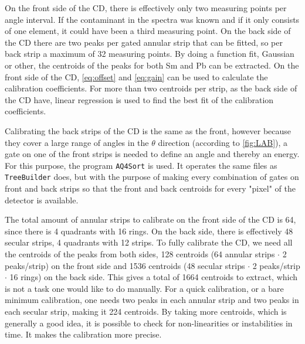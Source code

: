 \documentclass[twoside,english]{uiofysmaster/uiofysmaster}
\let\orgautoref\autoref
\renewcommand{\autoref}
        {%
		 \def\subsectionautorefname{Section}%
		 \def\subsubsectionautorefname{Section}%
          \orgautoref}
\begin{document}
On the front side of the CD, there is effectively only two measuring points per angle interval. 
If the contaminant in the spectra was known and if it only consists of one element, it could have been a third measuring point.  
On the back side of the CD there are two peaks per gated annular strip that can be fitted, so per back strip a maximum of 32 measuring points. 
By doing a function fit, Gaussian or other, the centroids of the peaks for both Sm and Pb can be extracted. 
On the front side of the CD, \autoref{eq:offset} and \autoref{eq:gain} can be used to calculate the calibration coefficients.
For more than two centroids per strip, as the back side of the CD have, linear regression is used to find the best fit of the calibration coefficients.

Calibrating the back strips of the CD is the same as the front, however because they cover a large range of angles in the $\theta$ direction (according to \autoref{fig:LAB}), a gate on one of the front strips is needed to define an angle and thereby an energy. 
For this purpose, the program \texttt{AQ4Sort} is used. 
It operates the same files as \texttt{TreeBuilder} does, but with the purpose of making every combination of gates on front and back strips so that the front and back centroids for every "pixel" of the detector is available.

The total amount of annular strips to calibrate on the front side of the CD is 64, since there is 4 quadrants with 16 rings. 
On the back side, there is effectively 48 secular strips, 4 quadrants with 12 strips.
To fully calibrate the CD, we need all the centroids of the peaks from both sides, 128 centroids (64 annular strips $\cdot$ 2 peaks/strip) on the front side and 1536 centroids (48 secular strips $\cdot$ 2 peaks/strip $\cdot$ 16 rings) on the back side. 
This gives a total of 1664 centroids to extract, which is not a task one would like to do manually.
For a quick calibration, or a bare minimum calibration, one needs two peaks in each annular strip and two peaks in each secular strip, making it 224 centroids.
By taking more centroids, which is generally a good idea, it is possible to check for non-linearities or instabilities in time.
It makes the calibration more precise.
\end{document}
